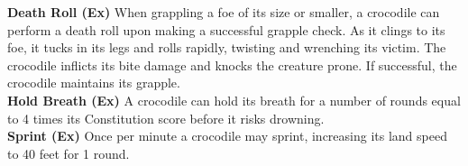\textbf{Death Roll (Ex)} When grappling a foe of its size or smaller, a crocodile can perform a death roll upon making a successful grapple check. As it clings to its foe, it tucks in its legs and rolls rapidly, twisting and wrenching its victim. The crocodile inflicts its bite damage and knocks the creature prone. If successful, the crocodile maintains its grapple. \\

\textbf{Hold Breath (Ex)} A crocodile can hold its breath for a number of rounds equal to 4 times its Constitution score before it risks drowning. \\

\textbf{Sprint (Ex)} Once per minute a crocodile may sprint, increasing its land speed to 40 feet for 1 round. \\

\newpage
